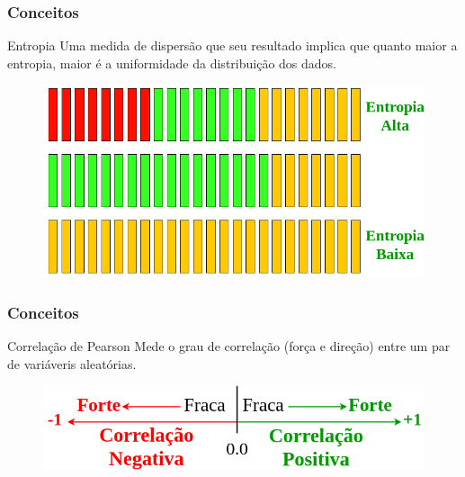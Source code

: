 \documentclass{beamer}
\begin{document}
\begin{frame}
\frametitle{Conceitos}
\begin{block}{Entropia}
Uma medida de dispers\~ao que seu resultado implica que quanto maior a entropia, maior \'e a uniformidade da distribui\c{c}\~ao dos dados. 
\end{block}
\begin{figure}
\centering
\includegraphics[scale=0.35]{figuras/entropiaSBIE.png}
\end{figure}
\end{frame}

\begin{frame}
\frametitle{Conceitos}
\begin{block}{Correla\c{c}\~ao de Pearson}
Mede o grau de correla\c{c}\~ao (for\c{c}a e dire\c{c}\~ao) entre um par de vari\'averis aleat\'orias.
\end{block}
\begin{figure}
\centering
\includegraphics[scale=0.4]{figuras/pearson.png}
\end{figure}

\end{frame}
\end{document}
